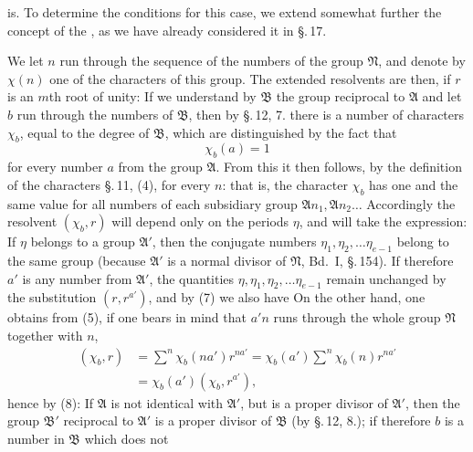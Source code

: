 is. To determine the conditions for this case, we extend somewhat
further the concept of the , as we have already
considered it in \S.\,17.

We let $n$ run through the sequence of the numbers of the group $\mathfrak{N}$,
and denote by $\chi(n)$ one of the characters of this
group. The extended resolvents are then, if $r$ is an
$m$th root of unity:
If we understand by $\mathfrak{B}$ the group reciprocal to $\mathfrak{A}$ and let
$b$ run through the numbers of $\mathfrak{B}$, then by \S.\,12, 7. there is
a number of characters $\chi_b$, equal to the degree of $\mathfrak{B}$, which are
distinguished by the fact that
\[
\chi_b(a) = 1
\]
for every number $a$ from the group $\mathfrak{A}$. From this it then follows,
by the definition of the characters \S.\,11, (4), for every $n$:
that is, the character $\chi_b$ has one and the same value for all
numbers of each subsidiary group $\mathfrak{A} n_1, \mathfrak{A} n_2 \ldots$ Accordingly
the resolvent $(\chi_b, r)$ will depend only on the periods $\eta$, and
will take the expression:
If $\eta$ belongs to a group $\mathfrak{A}'$, then the conjugate
numbers $\eta_1, \eta_2, \ldots \eta_{e-1}$ belong to the same group (because $\mathfrak{A}'$ is a
normal divisor of $\mathfrak{N}$, Bd.\ I, \S.\,154). If therefore $a'$ is any
number from $\mathfrak{A}'$, the quantities $\eta, \eta_1, \eta_2, \ldots \eta_{e-1}$ remain
unchanged by the substitution $(r, r^{a'})$, and by (7) we also have
On the other hand, one obtains from (5), if one bears in mind that
$a' n$ runs through the whole group $\mathfrak{N}$ together with $n$,
\[
\begin{aligned}
(\chi_b, r) &= \sum^{n} \chi_b(n a') r^{n a'} = \chi_b(a') \sum^{n} \chi_b(n) r^{n a'}\\
&= \chi_b(a') (\chi_b, r^{a'}),
\end{aligned}
\]
hence by (8):
If $\mathfrak{A}$ is not identical with $\mathfrak{A}'$, but is a proper divisor
of $\mathfrak{A}'$, then the group $\mathfrak{B}'$ reciprocal to $\mathfrak{A}'$ is a proper divisor
of $\mathfrak{B}$ (by \S.\,12, 8.); if therefore $b$ is a number in $\mathfrak{B}$ which does not
